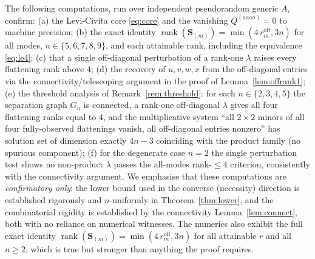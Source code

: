 The following computations, run over independent pseudorandom generic $A$, confirm:
(a) the Levi-Civita core \eqref{eq:core} and the vanishing $Q^{(aaaa)}=0$ to machine
precision;
(b) the exact identity $\operatorname{rank}(\mathbf S_{(m)})=\min(4\,r_m^{\mathrm{off}},3n)$
for all modes, $n\in\{5,6,7,8,9\}$, and each attainable rank, including the equivalence
\eqref{eq:le4};
(c) that a single off-diagonal perturbation of a rank-one $\lambda$ raises every
flattening rank above $4$;
(d) the recovery of $u,v,w,x$ from the off-diagonal entries via the
connectivity/telescoping argument in the proof of Lemma~\ref{lem:offrank1};
(e) the threshold analysis of Remark~\ref{rem:threshold}: for each $n\in\{2,3,4,5\}$ the
separation graph $G_n$ is connected, a rank-one off-diagonal $\lambda$ gives all four
flattening ranks equal to $4$, and the multiplicative system ``all $2\times2$ minors of all
four fully-observed flattenings vanish, all off-diagonal entries nonzero'' has solution set
of dimension exactly $4n-3$ coinciding with the product family (no spurious component);
(f) for the degenerate case $n=2$ the single perturbation test shows no non-product
$\lambda$ passes the all-modes rank-$\le4$ criterion, consistently with the connectivity
argument.
We emphasise that these computations are \emph{confirmatory only}: the lower bound used in
the converse (necessity) direction is established rigorously and $n$-uniformly in
Theorem~\ref{thm:lower}, and the combinatorial rigidity is established by the connectivity
Lemma~\ref{lem:connect}, both with no reliance on numerical witnesses. The numerics also
exhibit the full exact identity $\operatorname{rank}(\mathbf S_{(m)})=\min(4\,r_m^{\mathrm{off}},3n)$
for all attainable $r$ and all $n\ge2$, which is true but stronger than anything the proof
requires.


